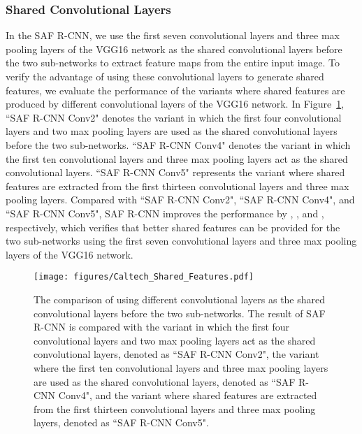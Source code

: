 \documentclass[journal]{IEEEtran}
\begin{document}
\subsubsection{Shared Convolutional Layers}
In the SAF R-CNN, we use the first seven convolutional layers and three max pooling layers of the VGG16 network as the shared convolutional layers before the two sub-networks to extract feature maps from the entire input image. To verify the advantage of using these convolutional layers to generate shared features, we evaluate the performance of the variants where shared features are produced by different convolutional layers of the VGG16 network. In Figure~\ref{fig:Caltech_Shared_Features}, ``SAF R-CNN Conv2" denotes the variant in which the first four convolutional layers and two max pooling layers are used as the shared convolutional layers before the two sub-networks. ``SAF R-CNN Conv4" denotes the variant in which the first ten convolutional layers and three max pooling layers act as the shared convolutional layers. ``SAF R-CNN Conv5" represents the variant where shared features are extracted from the first thirteen convolutional layers and three max pooling layers. Compared with ``SAF R-CNN Conv2", ``SAF R-CNN Conv4", and ``SAF R-CNN Conv5", SAF R-CNN improves the performance by , , and , respectively, which verifies that better shared features can be provided for the two sub-networks using the first seven convolutional layers and three max pooling layers of the VGG16 network.

\begin{figure}
	\begin{center}
		\texttt{[image: figures/Caltech\_Shared\_Features.pdf]}
		\caption{{The comparison of using different convolutional layers as the shared convolutional layers before the two sub-networks. The result of SAF R-CNN is compared with the variant in which the first four convolutional layers and two max pooling layers act as the shared convolutional layers, denoted as ``SAF R-CNN Conv2", the variant where the first ten convolutional layers and three max pooling layers are used as the shared convolutional layers, denoted as ``SAF R-CNN Conv4", and the variant where shared features are extracted from the first thirteen convolutional layers and three max pooling layers, denoted as ``SAF R-CNN Conv5".}}	
		\label{fig:Caltech_Shared_Features}
	\end{center}
	\vspace{-4mm}
\end{figure}
\end{document}
